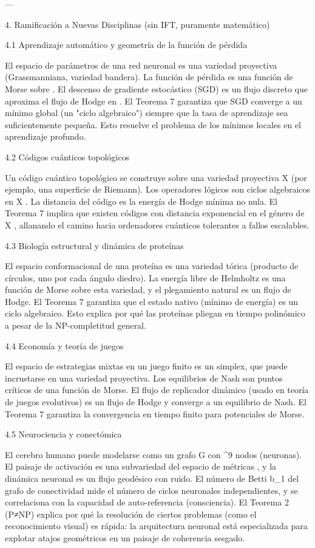 \documentclass[12pt,twoside]{book}
\begin{document}
---

4. Ramificación a Nuevas Disciplinas (sin IFT, puramente matemático)

4.1 Aprendizaje automático y geometría de la función de pérdida

El espacio de parámetros  \Theta  de una red neuronal es una variedad proyectiva (Grassmanniana, variedad bandera). La función de pérdida    es una función de Morse sobre  \Theta . El descenso de gradiente estocástico (SGD) es un flujo discreto que aproxima el flujo de Hodge en  \Theta . El Teorema 7 garantiza que SGD converge a un mínimo global (un "ciclo algebraico") siempre que la tasa de aprendizaje sea suficientemente pequeña. Esto resuelve el problema de los mínimos locales en el aprendizaje profundo.

4.2 Códigos cuánticos topológicos

Un código cuántico topológico se construye sobre una variedad proyectiva  X  (por ejemplo, una superficie de Riemann). Los operadores lógicos son ciclos algebraicos en  X . La distancia del código es la energía de Hodge mínima no nula. El Teorema 7 implica que existen códigos con distancia exponencial en el género de  X , allanando el camino hacia ordenadores cuánticos tolerantes a fallos escalables.

4.3 Biología estructural y dinámica de proteínas

El espacio conformacional de una proteína es una variedad tórica (producto de círculos, uno por cada ángulo diedro). La energía libre de Helmholtz es una función de Morse sobre esta variedad, y el plegamiento natural es un flujo de Hodge. El Teorema 7 garantiza que el estado nativo (mínimo de energía) es un ciclo algebraico. Esto explica por qué las proteínas pliegan en tiempo polinómico a pesar de la NP-completitud general.

4.4 Economía y teoría de juegos

El espacio de estrategias mixtas en un juego finito es un simplex, que puede incrustarse en una variedad proyectiva. Los equilibrios de Nash son puntos críticos de una función de Morse. El flujo de replicador dinámico (usado en teoría de juegos evolutivos) es un flujo de Hodge y converge a un equilibrio de Nash. El Teorema 7 garantiza la convergencia en tiempo finito para potenciales de Morse.

4.5 Neurociencia y conectómica

El cerebro humano puede modelarse como un grafo  G  con  ^{9}  nodos (neuronas). El paisaje de activación es una subvariedad del espacio de métricas   , y la dinámica neuronal es un flujo geodésico con ruido. El número de Betti  b_1  del grafo de conectividad mide el número de ciclos neuronales independientes, y se correlaciona con la capacidad de auto-referencia (consciencia). El Teorema 2 (P≠NP) explica por qué la resolución de ciertos problemas (como el reconocimiento visual) es rápida: la arquitectura neuronal está especializada para explotar atajos geométricos en un paisaje de coherencia sesgado.
\end{document}
